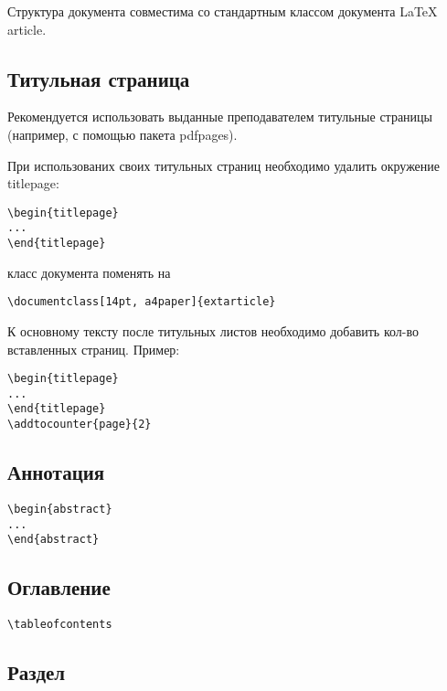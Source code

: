 \documentclass[14pt, a4paper, titlepage]{extarticle}
\renewenvironment{abstract}{\clearpage\section*{\MakeUppercase{\abstractname}}}{\clearpage}
\renewcommand{\thesection}{\Asbuk{section}}
\let\oldsec\section
\renewcommand{\section}{
        \clearpage
        \phantomsection
        \refstepcounter{section}
        \addcontentsline{toc}{section}{\appendixname~\thesection}
        \oldsec*} %
\begin{document}
Структура документа совместима со стандартным классом документа \LaTeX{} article.

\subsection{Титульная страница}

Рекомендуется использовать выданные преподавателем титульные страницы (например, с помощью пакета pdfpages).
    
При использованих своих титульных страниц необходимо удалить окружение titlepage:

\begin{verbatim}
\begin{titlepage}
...
\end{titlepage}
\end{verbatim}
класс документа поменять на

\begin{verbatim}
\documentclass[14pt, a4paper]{extarticle} 
\end{verbatim}

К основному тексту после титульных листов необходимо добавить кол-во вставленных страниц. Пример:
\begin{verbatim}
\begin{titlepage}
...
\end{titlepage}
\addtocounter{page}{2}
\end{verbatim}

\subsection{Аннотация}

\begin{verbatim}
\begin{abstract}
...
\end{abstract}
\end{verbatim}

\subsection{Оглавление}

\begin{verbatim}
\tableofcontents
\end{verbatim}

\subsection{Раздел}
\end{document}
